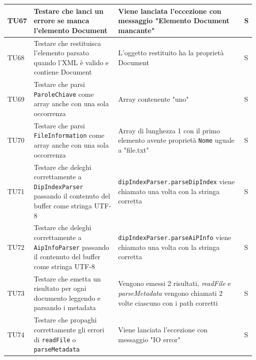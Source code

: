 \documentclass[a4paper,12pt]{article}
\begin{document}
\begin{longtable}{|M{1.2cm}|M{5cm}|M{8cm}|M{1.5cm}|}
            TU67 & Testare che \texttt{} lanci un errore se manca l'elemento Document & Viene lanciata l'eccezione con messaggio "Elemento Document mancante" & S \\
            \hline

            TU68 & Testare che \texttt{} restituisca l'elemento parsato quando l'XML è valido e contiene Document & L'oggetto restituito ha la proprietà Document & S \\
            \hline

            TU69 & Testare che \texttt{} parsi \texttt{ParoleChiave} come array anche con una sola occorrenza & Array contenente "uno" & S \\
            \hline

            TU70 & Testare che \texttt{} parsi \texttt{FileInformation} come array anche con una sola occorrenza & Array di lunghezza 1 con il primo elemento avente proprietà \texttt{Nome} uguale a "file.txt" & S \\
            \hline

            TU71 & Testare che \texttt{} deleghi correttamente a \texttt{DipIndexParser} passando il contenuto del buffer come stringa UTF-8 & \texttt{dipIndexParser.parseDipIndex} viene chiamato una volta con la stringa corretta & S \\
            \hline

            TU72 & Testare che \texttt{} deleghi correttamente a \texttt{AipInfoParser} passando il contenuto del buffer come stringa UTF-8 & \texttt{dipIndexParser.parseAiPInfo} viene chiamato una volta con la stringa corretta & S \\
            \hline

            TU73 & Testare che \texttt{} emetta un risultato per ogni documento leggendo e parsando i metadata & Vengono emessi 2 risultati, \textsl{readFile} e \textsl{parseMetadata} vengono chiamati 2 volte ciascuno con i path corretti & S \\
            \hline

            TU74 & Testare che \texttt{} propaghi correttamente gli errori di \texttt{readFile} o \texttt{parseMetadata} & Viene lanciata l'eccezione con messaggio "IO error" & S \\
            \hline
        

\end{longtable}
\end{document}
